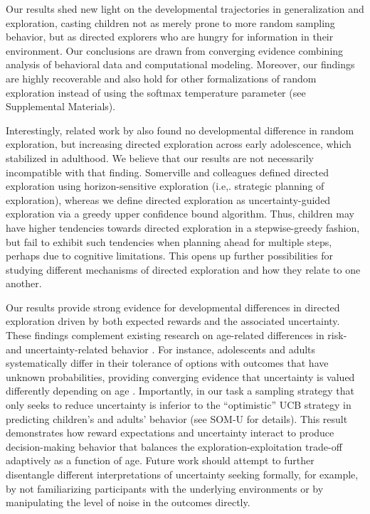 \documentclass[a4paper,man, floatsintext, natbib]{apa6}
\begin{document}
Our results shed new light on the developmental trajectories in generalization and exploration, casting children not as merely prone to more random sampling behavior, but as directed explorers who are hungry for information in their environment. Our conclusions are drawn from converging evidence combining analysis of behavioral data and computational modeling. Moreover, our findings are highly recoverable and also hold for other formalizations of random exploration instead of using the softmax temperature parameter (see Supplemental Materials).

Interestingly, related work by \cite{somerville2017charting} also found no developmental difference in random exploration, but increasing directed exploration across early adolescence, which stabilized in adulthood. We believe that our results are not necessarily incompatible with that finding. Somerville and colleagues defined directed exploration using horizon-sensitive exploration (i.e,. strategic planning of exploration), whereas we define directed exploration as uncertainty-guided exploration via a greedy upper confidence bound algorithm. Thus, children may have higher tendencies towards directed exploration in a stepwise-greedy fashion, but fail to exhibit such tendencies when planning ahead for multiple steps, perhaps due to cognitive limitations. This opens up further possibilities for studying different mechanisms of directed exploration and how they relate to one another.

Our results provide strong evidence for developmental differences in directed exploration driven by both expected rewards and the associated uncertainty. 
These findings complement existing research on age-related differences in risk- and uncertainty-related behavior \citep{josef2016stability}. For instance, adolescents and adults systematically differ in their tolerance of options with outcomes that have unknown probabilities, providing converging evidence that uncertainty is valued differently depending on age \citep{tymula2012adolescents}. Importantly, in our task a sampling strategy that only seeks to reduce uncertainty is inferior to the ``optimistic'' UCB strategy in predicting children's and adults' behavior (see SOM-U for details). This result demonstrates how reward expectations and uncertainty interact to produce decision-making behavior that balances the exploration-exploitation trade-off adaptively as a function of age. Future work should attempt to further disentangle different interpretations of uncertainty seeking formally, for example, by not familiarizing participants with the underlying environments or by manipulating the level of noise in the outcomes directly.
\end{document}

